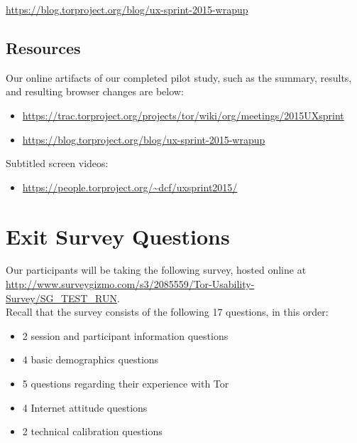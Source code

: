 \documentclass[letterpaper,twocolumn,11pt]{article}
\begin{document}
\url{https://blog.torproject.org/blog/ux-sprint-2015-wrapup}

\subsection{Resources}

Our online artifacts of our completed pilot study, such as 
the summary, results, and resulting browser changes are below:
\begin{itemize} \itemsep1pt \parskip0pt 
\item \url{https://trac.torproject.org/projects/tor/wiki/org/meetings/2015UXsprint}
\item \url{https://blog.torproject.org/blog/ux-sprint-2015-wrapup}
\end{itemize}

\noindent Subtitled screen videos:
\begin{itemize} \itemsep1pt \parskip0pt 
\item \url{https://people.torproject.org/~dcf/uxsprint2015/}
\end{itemize}

\section{Exit Survey Questions}
\label{sec:survey} 
\indent \indent Our participants will be taking the following survey, hosted online at 
\url{http://www.surveygizmo.com/s3/2085559/Tor-Usability-Survey/SG_TEST_RUN}.\\

\noindent Recall that the survey consists of the following 17 questions, in this order: 
\begin{itemize} \itemsep1pt \parskip0pt 
\item 2 session and participant information questions
\item 4 basic demographics questions
\item 5 questions regarding their experience with Tor
\item 4 Internet attitude questions
\item 2 technical calibration questions
\end{itemize}
\end{document}
